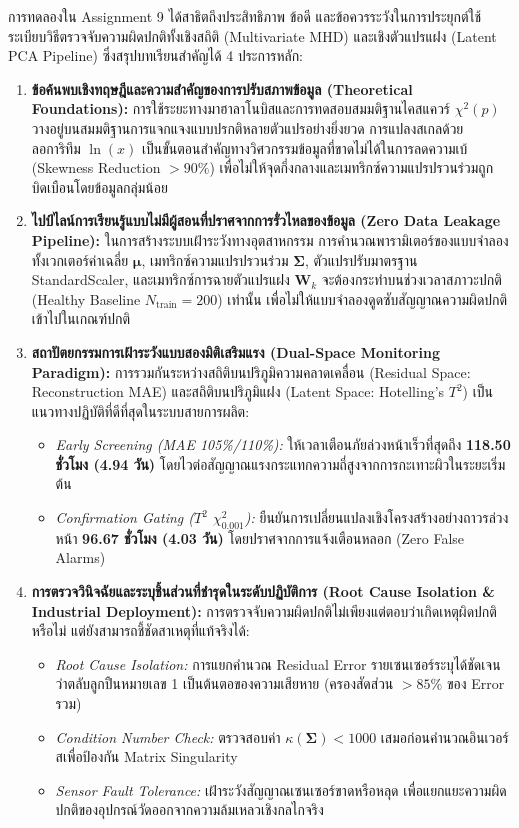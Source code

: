 \documentclass[12pt,a4paper]{article}
\begin{document}
การทดลองใน Assignment 9 ได้สาธิตถึงประสิทธิภาพ ข้อดี และข้อควรระวังในการประยุกต์ใช้ระเบียบวิธีตรวจจับความผิดปกติทั้งเชิงสถิติ (Multivariate MHD) และเชิงตัวแปรแฝง (Latent PCA Pipeline) ซึ่งสรุปบทเรียนสำคัญได้ 4 ประการหลัก:
\begin{enumerate}[leftmargin=1.5em, itemsep=2.0pt]
    \item \textbf{ข้อค้นพบเชิงทฤษฎีและความสำคัญของการปรับสภาพข้อมูล (Theoretical Foundations):} การใช้ระยะทางมาฮาลาโนบิสและการทดสอบสมมติฐานไคสแควร์ $\chi^2(p)$ วางอยู่บนสมมติฐานการแจกแจงแบบปรกติหลายตัวแปรอย่างยิ่งยวด การแปลงสเกลด้วยลอการิทึม $\ln(x)$ เป็นขั้นตอนสำคัญทางวิศวกรรมข้อมูลที่ขาดไม่ได้ในการลดความเบ้ (Skewness Reduction $> 90\%$) เพื่อไม่ให้จุดกึ่งกลางและเมทริกซ์ความแปรปรวนร่วมถูกบิดเบือนโดยข้อมูลกลุ่มน้อย
    \item \textbf{ไปป์ไลน์การเรียนรู้แบบไม่มีผู้สอนที่ปราศจากการรั่วไหลของข้อมูล (Zero Data Leakage Pipeline):} ในการสร้างระบบเฝ้าระวังทางอุตสาหกรรม การคำนวณพารามิเตอร์ของแบบจำลอง ทั้งเวกเตอร์ค่าเฉลี่ย $\boldsymbol{\mu}$, เมทริกซ์ความแปรปรวนร่วม $\mathbf{\Sigma}$, ตัวแปรปรับมาตรฐาน StandardScaler, และเมทริกซ์การฉายตัวแปรแฝง $\mathbf{W}_k$ จะต้องกระทำบนช่วงเวลาสภาวะปกติ (Healthy Baseline $N_{\text{train}} = 200$) เท่านั้น เพื่อไม่ให้แบบจำลองดูดซับสัญญาณความผิดปกติเข้าไปในเกณฑ์ปกติ
    \item \textbf{สถาปัตยกรรมการเฝ้าระวังแบบสองมิติเสริมแรง (Dual-Space Monitoring Paradigm):} การรวมกันระหว่างสถิติบนปริภูมิความคลาดเคลื่อน (Residual Space: Reconstruction MAE) และสถิติบนปริภูมิแฝง (Latent Space: Hotelling's $T^2$) เป็นแนวทางปฏิบัติที่ดีที่สุดในระบบสายการผลิต:
    \begin{itemize}[leftmargin=1.2em, itemsep=1.0pt, topsep=1.0pt]
        \item \textit{Early Screening (MAE 105\%/110\%):} ให้เวลาเตือนภัยล่วงหน้าเร็วที่สุดถึง \textbf{118.50 ชั่วโมง (4.94 วัน)} โดยไวต่อสัญญาณแรงกระแทกความถี่สูงจากการกะเทาะผิวในระยะเริ่มต้น
        \item \textit{Confirmation Gating ($T^2$ $\chi^2_{0.001}$):} ยืนยันการเปลี่ยนแปลงเชิงโครงสร้างอย่างถาวรล่วงหน้า \textbf{96.67 ชั่วโมง (4.03 วัน)} โดยปราศจากการแจ้งเตือนหลอก (Zero False Alarms)
    \end{itemize}
    \item \textbf{การตรวจวินิจฉัยและระบุชิ้นส่วนที่ชำรุดในระดับปฏิบัติการ (Root Cause Isolation \& Industrial Deployment):} การตรวจจับความผิดปกติไม่เพียงแต่ตอบว่าเกิดเหตุผิดปกติหรือไม่ แต่ยังสามารถชี้ชัดสาเหตุที่แท้จริงได้:
    \begin{itemize}[leftmargin=1.2em, itemsep=1.0pt, topsep=1.0pt]
        \item \textit{Root Cause Isolation:} การแยกคำนวณ Residual Error รายเซนเซอร์ระบุได้ชัดเจนว่าตลับลูกปืนหมายเลข 1 เป็นต้นตอของความเสียหาย (ครองสัดส่วน $>85\%$ ของ Error รวม)
        \item \textit{Condition Number Check:} ตรวจสอบค่า $\kappa(\mathbf{\Sigma}) < 1000$ เสมอก่อนคำนวณอินเวอร์สเพื่อป้องกัน Matrix Singularity
        \item \textit{Sensor Fault Tolerance:} เฝ้าระวังสัญญาณเซนเซอร์ขาดหรือหลุด เพื่อแยกแยะความผิดปกติของอุปกรณ์วัดออกจากความล้มเหลวเชิงกลไกจริง
    \end{itemize}
\end{enumerate}
\end{document}

